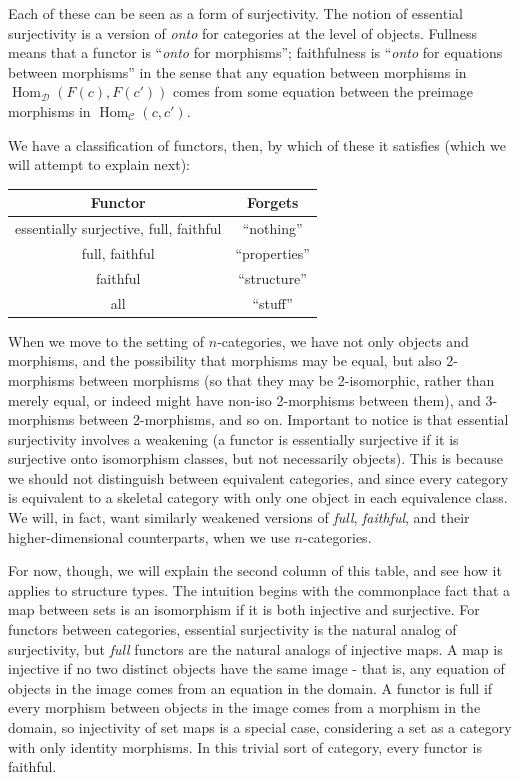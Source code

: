 \documentclass{amsart} \usepackage{amsmath,amssymb,bbm}
\newcommand{\opname}[1]{\operatorname{#1}}
\begin{document}
Each of these can be seen as a form of surjectivity.  The notion of essential
surjectivity is a version of {\textit{onto}} for categories at the level of
objects. Fullness means that a functor is ``{\textit{onto}} for morphisms'';
faithfulness is ``{\textit{onto}} for equations between morphisms'' in the sense
that any equation between morphisms in $\opname{Hom}_{\mathcal{D}} ( F ( c ), F
( c' ) )$ comes from some equation between the preimage morphisms in
$\opname{Hom}_{\mathcal{C}} ( c, c' )$.

We have a classification of functors, then, by which of these it satisfies
(which we will attempt to explain next):

\begin{center}
  \begin{tabular}{|c|c|}
    \hline
    {\textbf{Functor}} & {\textbf{Forgets}}\\
    \hline
    essentially surjective, full, faithful & ``nothing''\\
    \hline
    full, faithful & ``properties''\\
    \hline
    faithful & ``structure''\\
    \hline
    all & ``stuff''\\
    \hline
  \end{tabular}
\end{center}

When we move to the setting of $n$-categories, we have not only objects and
morphisms, and the possibility that morphisms may be equal, but also
2-morphisms between morphisms (so that they may be 2-isomorphic, rather than
merely equal, or indeed might have non-iso 2-morphisms between them), and
3-morphisms between 2-morphisms, and so on.  Important to notice is that
essential surjectivity involves a weakening (a functor is essentially
surjective if it is surjective onto isomorphism classes, but not necessarily
objects).  This is because we should not distinguish between equivalent
categories, and since every category is equivalent to a skeletal category with
only one object in each equivalence class.  We will, in fact, want similarly
weakened versions of {\textit{full}}, {\textit{faithful}}, and their
higher-dimensional counterparts, when we use $n$-categories.

For now, though, we will explain the second column of this table, and see how
it applies to structure types.  The intuition begins with the commonplace fact
that a map between sets is an isomorphism if it is both injective and
surjective.  For functors between categories, essential surjectivity is the
natural analog of surjectivity, but \textit{full} functors are the natural
analogs of injective maps.  A map is injective if no two distinct objects have
the same image - that is, any equation of objects in the image comes from an
equation in the domain.  A functor is full if every morphism between objects
in the image comes from a morphism in the domain, so injectivity of set maps
is a special case, considering a set as a category with only identity
morphisms. In this trivial sort of category, every functor is faithful.
\end{document}
